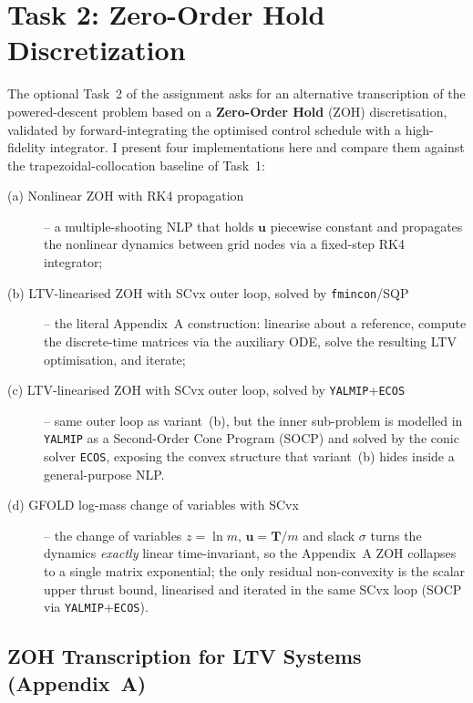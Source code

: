 \documentclass[../main.tex]{subfiles}
\begin{document}
\section{Task 2: Zero-Order Hold Discretization}\label{sec:task2}

The optional Task~2 of the assignment asks for an alternative transcription of the powered-descent problem based on a \textbf{Zero-Order Hold} (ZOH) discretisation, validated by forward-integrating the optimised control schedule with a high-fidelity integrator. I present four implementations here and compare them against the trapezoidal-collocation baseline of Task~1:
\begin{description}
    \item[(a) Nonlinear ZOH with RK4 propagation] -- a multiple-shooting NLP that holds $\mathbf{u}$ piecewise constant and propagates the nonlinear dynamics between grid nodes via a fixed-step RK4 integrator;
    \item[(b) LTV-linearised ZOH with SCvx outer loop, solved by \texttt{fmincon}/SQP] -- the literal Appendix~A construction: linearise about a reference, compute the discrete-time matrices via the auxiliary ODE, solve the resulting LTV optimisation, and iterate;
    \item[(c) LTV-linearised ZOH with SCvx outer loop, solved by \texttt{YALMIP}+\texttt{ECOS}] -- same outer loop as variant~(b), but the inner sub-problem is modelled in \texttt{YALMIP} as a Second-Order Cone Program (SOCP) and solved by the conic solver \texttt{ECOS}, exposing the convex structure that variant~(b) hides inside a general-purpose NLP.
    \item[(d) GFOLD log-mass change of variables with SCvx] -- the change of variables $z=\ln m$, $\mathbf{u}=\mathbf{T}/m$ and slack $\sigma$ turns the dynamics \emph{exactly} linear time-invariant, so the Appendix~A ZOH collapses to a single matrix exponential; the only residual non-convexity is the scalar upper thrust bound, linearised and iterated in the same SCvx loop (SOCP via \texttt{YALMIP}+\texttt{ECOS}).
\end{description}

\subsection{ZOH Transcription for LTV Systems (Appendix~A)}\label{sec:zoh_appendix}
\end{document}
